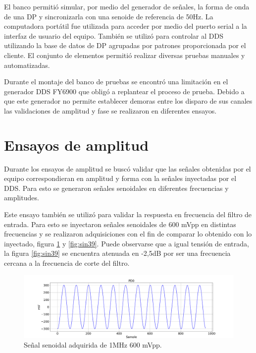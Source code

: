 El banco permitió simular, por medio del generador de señales, la forma de onda de una DP y sincronizarla con una senoide de referencia de 50Hz. La computadora portátil fue utilizada para acceder por medio del puerto serial a la interfaz de usuario del equipo. También se utilizó para controlar al DDS utilizando la base de datos de DP agrupadas por patrones proporcionada por el cliente.
El conjunto de elementos permitió realizar diversas pruebas manuales y automatizadas.

Durante el montaje del banco de pruebas se encontró una limitación en el generador DDS FY6900 que obligó a replantear el proceso de prueba. Debido a que este generador no permite establecer demoras entre los disparo de sus canales las validaciones de amplitud y fase se realizaron en diferentes ensayos.

\section{Ensayos de amplitud}
Durante los ensayos de amplitud se buscó validar que las señales obtenidas por el equipo correspondieran en amplitud y forma con la señales inyectadas por el DDS. Para esto se generaron señales senoidales en diferentes frecuencias y amplitudes.

Este ensayo también se utilizó para validar la respuesta en frecuencia del filtro de entrada. Para esto se inyectaron señales senoidales de 600 mVpp en distintas frecuencias y se realizaron adquisiciones con el fin de comparar lo obtenido con lo inyectado, figura \ref{fig:sin1} y \ref{fig:sin39}. Puede observarse que a igual tensión de entrada, la figura \ref{fig:sin39} se encuentra atenuada en -2,5dB por ser una frecuencia cercana a la frecuencia de corte del filtro. 

\begin{figure}[htpb]
	\hspace{-1.2cm}
	\includegraphics[width=165mm]{./Figures/sin1.png}
	\caption{Señal senoidal adquirida de 1MHz 600 mVpp.}
	\label{fig:sin1}
\end{figure}


